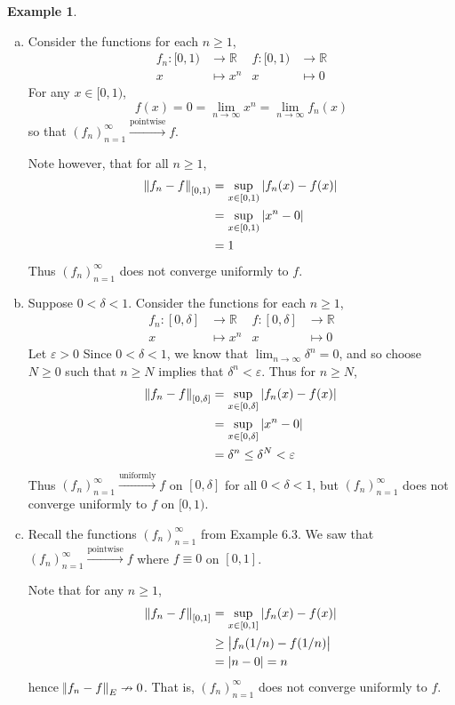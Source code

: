 \documentclass[11pt]{article}
\theoremstyle{definition}
\newtheorem{exmp}[thm]{Example}
\newcommand{\mbR}{\ensuremath{\mathbb{R}}}
\begin{document}
\begin{exmp}~
\begin{enumerate}[(a)]  \vspace{-0.2cm}

\item Consider the functions for each $n \geq 1$,
\begin{align*}
f_n : [0, 1) & \to \mbR   & f : [0, 1) & \to \mbR \\
x & \mapsto x^n           & x & \mapsto 0
\end{align*}
For any $x \in [0, 1)$,
$$f(x) = 0 = \lim_{n\to\infty} x^n = \lim_{n\to\infty} f_n(x)$$
so that $(f_n)_{n=1}^\infty \xrightarrow{\text{pointwise}} f$. 

Note however, that for all $n \geq 1$,
\begin{align*}
\norm{f_n - f}_{[0, 1)} & = \sup_{x \in [0, 1)} |f_n(x) - f(x)| \\
& = \sup_{x \in [0, 1)} |x^n - 0| \\
& = 1
\end{align*}
Thus $(f_n)_{n=1}^\infty$ does not converge uniformly to $f$.

\item Suppose $0 < \delta < 1$. Consider the functions for each $n \geq 1$,
\begin{align*}
f_n : [0, \delta] & \to \mbR   & f : [0, \delta] & \to \mbR \\
x & \mapsto x^n                  & x & \mapsto 0
\end{align*}
Let $\varepsilon > 0$ Since $0 < \delta < 1$, we know that $\lim_{n\to\infty} \delta^n = 0$, and so choose $N \geq 0$ such that $n \geq N$ implies that $\delta^n < \varepsilon$. Thus for $n \geq N$,
\begin{align*}
\norm{f_n - f}_{[0, \delta]} & = \sup_{x \in [0, \delta]} |f_n(x) - f(x)| \\
& = \sup_{x \in [0, \delta]} |x^n - 0| \\
& = \delta^n \leq \delta^N < \varepsilon
\end{align*}
Thus $(f_n)_{n=1}^\infty \xrightarrow{\text{uniformly}} f$ on $[0, \delta]$ for all $0 < \delta < 1$, but $(f_n)_{n=1}^\infty$ does not converge uniformly to $f$ on $[0, 1)$. 

\item Recall the functions $(f_n)_{n=1}^\infty$ from Example 6.3. We saw that $(f_n)_{n=1}^\infty \xrightarrow{\text{pointwise}} f$ where $f \equiv 0$ on $[0, 1]$.

Note that for any $n \geq 1$,
\begin{align*}
\norm{f_n - f}_{[0, 1]} & = \sup_{x \in [0, 1]} |f_n(x) - f(x)| \\
& \geq \left|f_n(1/n) - f(1/n)\right| \\
& = |n - 0| = n
\end{align*}
hence $\norm{f_n - f}_E \nrightarrow 0$. That is, $(f_n)_{n=1}^\infty$ does not converge uniformly to $f$.

\end{enumerate}
\end{exmp}
\end{document}
